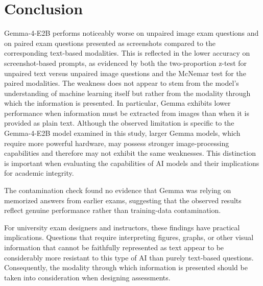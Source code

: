 \documentclass{article}
\begin{document}
\section{Conclusion}

Gemma-4-E2B performs noticeably worse on unpaired image exam questions and on paired exam questions presented as screenshots compared to the corresponding text-based modalities. This is reflected in the lower accuracy on screenshot-based prompts, as evidenced by both the two-proportion z-test for unpaired text versus unpaired image questions and the McNemar test for the paired modalities. The weakness does not appear to stem from the model's understanding of machine learning itself but rather from the modality through which the information is presented. In particular, Gemma exhibits lower performance when information must be extracted from images than when it is provided as plain text. Although the observed limitation is specific to the Gemma-4-E2B model examined in this study, larger Gemma models, which require more powerful hardware, may possess stronger image-processing capabilities and therefore may not exhibit the same weaknesses. This distinction is important when evaluating the capabilities of AI models and their implications for academic integrity.


The contamination check found no evidence that Gemma was relying on memorized answers from earlier exams, suggesting that the observed results reflect genuine performance rather than training-data contamination.

For university exam designers and instructors, these findings have practical implications. Questions that require interpreting figures, graphs, or other visual information that cannot be faithfully represented as text appear to be considerably more resistant to this type of AI than purely text-based questions. Consequently, the modality through which information is presented should be taken into consideration when designing assessments.




\newpage

\printbibliography[]

\vfill %
\end{document}
